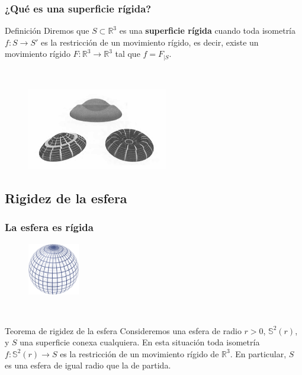 \documentclass{beamer}
\begin{document}
	\begin{frame}
		\frametitle{¿Qué es una superficie rígida?}
		\begin{block}{Definición}
			Diremos que $S \subset \mathbb{R}^3$ es una \textbf{superficie rígida} cuando toda isometría $f : S \to S'$ es la restricción de un movimiento rígido, es decir, existe un movimiento rígido $F : \mathbb{R}^3 \to \mathbb{R}^3$ tal que $f = F_{|S}$.
		\end{block}
		${ }$\\
		\begin{figure}[h]
			\begin{center}
				\includegraphics[width=0.55\textwidth]{imagenes/no_rigid}
			\end{center}
		\end{figure}
	\end{frame}
	
	
	\subsection{Rigidez de la esfera}
	
	\begin{frame}
		\frametitle{La esfera es rígida}
		\begin{figure}[h]
			\begin{center}
				\includegraphics[width=0.2\textwidth]{imagenes/sphere.png}
			\end{center}
		\end{figure}
		${ }$\\
		\begin{block}{Teorema de rigidez de la esfera}
			Consideremos una esfera de radio $r>0$, $\mathbb{S}^2(r)$, y $S$ una superficie conexa cualquiera. En esta situación toda isometría $f : \mathbb{S}^2(r) \to S$ es la restricción de un movimiento rígido de $\mathbb{R}^3$. En particular, $S$ es una esfera de igual radio que la de partida.
		\end{block}
	\end{frame}
	
\end{document}
